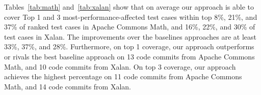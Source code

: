 


Tables~\ref{tab:math} and~\ref{tab:xalan} show that on average our approach is able to cover Top 1 and 3 most-performance-affected test cases within top 8\%, 21\%, and 37\% of ranked test cases in Apache Commons Math, and 16\%, 22\%, and 30\% of test cases in Xalan. The improvements over the baselines approaches are at least 33\%, 37\%, and 28\%. Furthermore, on top 1 coverage, our approach outperforms or rivals the best baseline approach on 13 code commits from Apache Commons Math, and 10 code commits from Xalan. On top 3 coverage, our approach achieves the highest percentage on 11 code commits from Apache Commons Math, and 14 code commits from Xalan. 





